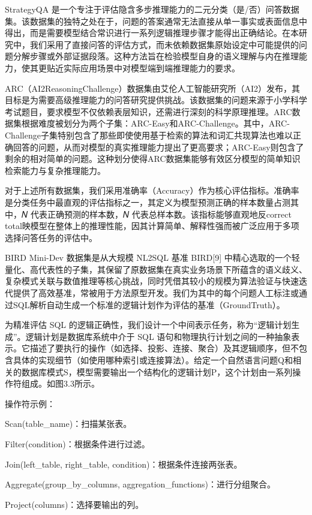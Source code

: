 \documentclass[12pt,a4paper,openright,UTF8]{ctexbook}
\begin{document}
StrategyQA 是一个专注于评估隐含多步推理能力的二元分类（是/否）问答数据集。该数据集的独特之处在于，问题的答案通常无法直接从单一事实或表面信息中得出，而是需要模型结合常识进行一系列逻辑推理步骤才能得出正确结论。在本研究中，我们采用了直接问答的评估方式，而未依赖数据集原始设定中可能提供的问题分解步骤或外部证据段落。这种方法旨在检验模型自身的语义理解与内在推理能力，使其更贴近实际应用场景中对模型端到端推理能力的要求。


ARC（AI2ReasoningChallenge）数据集由艾伦人工智能研究所（AI2）发布，其目标是为需要高级推理能力的问答研究提供挑战。该数据集的问题来源于小学科学考试题目，要求模型不仅依赖表层知识，还需进行深刻的科学原理推理。ARC数据集根据难度被划分为两个子集：ARC-Easy和ARC-Challenge。其中，ARC-Challenge子集特别包含了那些即使使用基于检索的算法和词汇共现算法也难以正确回答的问题，从而对模型的真实推理能力提出了更高要求；ARC-Easy则包含了剩余的相对简单的问题。这种划分使得ARC数据集能够有效区分模型的简单知识检索能力与复杂推理能力。


对于上述所有数据集，我们采用准确率（Accuracy）作为核心评估指标。准确率是分类任务中最直观的评估指标之一，其定义为模型预测正确的样本数量占测其中，𝑁 代表正确预测的样本数，𝑁 代表总样本数。该指标能够直观地反correct total映模型在整体上的推理性能，因其计算简单、解释性强而被广泛应用于多项选择问答任务的评估中。


BIRD Mini-Dev 数据集是从大规模 NL2SQL 基准 BIRD[9] 中精心选取的一个轻量化、高代表性的子集，其保留了原数据集在真实业务场景下所蕴含的语义歧义、复杂模式关联与数值推理等核心挑战，同时凭借其较小的规模为算法验证与快速迭代提供了高效基准，常被用于方法原型开发。我们为其中的每个问题人工标注或通过SQL解析自动生成一个标准的逻辑计划作为评估的基准（GroundTruth）。


为精准评估 SQL 的逻辑正确性，我们设计一个中间表示任务，称为“逻辑计划生成”。逻辑计划是数据库系统中介于 SQL 语句和物理执行计划之间的一种抽象表示。它描述了要执行的操作（如选择、投影、连接、聚合）及其逻辑顺序，但不包含具体的实现细节（如使用哪种索引或连接算法）。给定一个自然语言问题Q和相关的数据库模式S，模型需要输出一个结构化的逻辑计划P，这个计划由一系列操作符组成。如图3.3所示。


操作符示例：


Scan(table\_name)：扫描某张表。


Filter(condition)：根据条件进行过滤。


Join(left\_table, right\_table, condition)：根据条件连接两张表。


Aggregate(group\_by\_columns, aggregation\_functions)：进行分组聚合。


Project(columns)：选择要输出的列。
\end{document}
